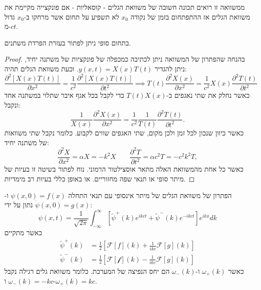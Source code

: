 \documentclass{tstextbook}
\begin{document}
\begin{remark}
ממשוואה זו רואים תכונה חשובה של משוואת הגלים - קוסאליות - אם פונקצייה מקיימת את משוואת הגלים אז ההתפתחום בזמן של נקודה \(x_{0}\) לא תשפיע על תחום אשר מרחקו ב-\(x_{0}\) גדול מ-\(ct\).

\end{remark}
\begin{proposition}
בתחום סופי ניתן לפתור בעזרת הפרדת משתנים. 

\end{proposition}
\begin{proof}
בהנחה שהפתרון של המשוואה ניתן לכתיבה כמכפלה של פונקציות של משתנה יחיד, ניתן להגדיר \(y(x,t)=X(x)T(t)\). וכעת משוואת הגלים תהיה:
$$ \frac{\partial^2[X(x)T(t)]}{\partial x^2}=\frac1{ c ^2}\frac{\partial^2[X(x)T(t)]}{\partial t^2}\implies T(t)\frac{\partial^2X(x)}{\partial x^2}=\frac{1}{ c ^2}X(x)\frac{\partial^2T(t)}{\partial t^2}$$
כאשר נחלק את שתי נאגפים ב-\(T(t)X(x)\) כדי לקבל בכל אגף איבר שתלוי במשתנה אחד ונקבל:
$$ \frac1{X(x)}\frac{\partial^2X(x)}{\partial x^2}=\frac1{ c ^2}\frac1{T(t)}\frac{\partial^2T(t)}{\partial t^2}.$$
כאשר כיוון שנכון לכל זמן ולכן מקום, שתי האגפים שווים לקבוע. כלומר נקבל שתי משוואות של משתנה יחיד:
$$ \frac{\partial^2X}{\partial x^2}=\alpha X=-k^2X\qquad \frac{\partial^2T}{\partial t^2}=\alpha c ^2T=- c ^2k^2T,$$
כאשר כל אחת מהמשוואת האלה מתאר אוסצילטור הרמוני. נוח לפתור בשיטה זו בעיות של מיתר סופי או תנאי שפה מחזוריים. או באופן כללי בעיות רב מימדיות.

\end{proof}
\begin{proposition}
הפתרון של משוואת הגלים של מיתר אינסופי עם תנאי התחלה \(\psi(x,0)=f(x)\) ו-\(\dot{\psi}(x,0)=g(x)\) נתון על ידי:
$$ \psi(x,t)=\frac{1}{\sqrt{2\pi}}\int_{-\infty}^{\infty}\left[\tilde{\psi}^{+}\left(k\right)e^{ikct}+\tilde{\psi}^{-}\left(k\right)e^{-ikct}\right]e^{ikx}dk$$
כאשר מתקיים
$$ \begin{aligned}\tilde{\psi}^{+}(k)&=\frac{1}{2}\left[\mathcal{F} [{f}](k)+\frac{1}{ikc}\mathcal{F} [{g}](k)\right]\\ \tilde{\psi}^{-}\left(k\right)&=\frac{1}{2}\left[\mathcal{F[f]} (k)-\frac{1}{ikc}\mathcal{F} [{g}](k)\right]\end{aligned}$$
כאשר \(\omega_{+}(k)\) ו-\(\omega_{-}(k)\) הם יחס הנפיצה של המערכת. כלומר משוואת גלים רגילה נקבל \(\omega_{-}(k)=-kc\) ו-\(\omega_{+}(k)=kc\).

\end{proposition}
\end{document}
